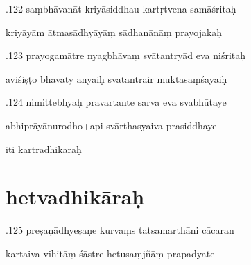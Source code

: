 \documentclass[article,12pt,a4paper]{memoir}%
\newcounter{parCount}
\begin{document}
	  
	  \pstart {}.122 saṃbhāvanāt kriyāsiddhau kartṛtvena samāśritaḥ 
	{}
	\pend%
      

	  
	  \pstart \leavevmode%
	kriyāyām ātmasādhyāyāṃ sādhanānāṃ prayojakaḥ 
	{}
	\pend%
      

	  
	  \pstart {}.123 prayogamātre nyagbhāvaṃ svātantryād eva niśritaḥ 
	{}
	\pend%
      

	  
	  \pstart \leavevmode%
	aviśiṣṭo bhavaty anyaiḥ svatantrair muktasaṃśayaiḥ 
	{}
	\pend%
      

	  
	  \pstart {}.124 nimittebhyaḥ pravartante sarva eva svabhūtaye 
	{}
	\pend%
      

	  
	  \pstart \leavevmode%
	abhiprāyānurodho+api svārthasyaiva prasiddhaye 
	{}
	\pend%
      

	  
	  \pstart \leavevmode%
	iti kartradhikāraḥ
	{}
	\pend%
      
	  
	
\chapter[{hetvadhikāraḥ}][{hetvadhikāraḥ}]{ hetvadhikāraḥ}

	  
	  \pstart {}.125 preṣaṇādhyeṣaṇe kurvaṃs tatsamarthāni cācaran 
	{}
	\pend%
      

	  
	  \pstart \leavevmode%
	kartaiva vihitāṃ śāstre hetusaṃjñāṃ prapadyate 
	{}
	\pend%
      
\end{document}
